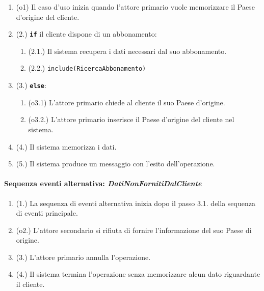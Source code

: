\documentclass{article}
\begin{document}
	\begin{enumerate}[itemsep=8pt,parsep=0pt]
	    \item(o1) Il caso d'uso inizia quando l'attore primario vuole memorizzare il Paese d'origine del cliente. 
	    \item(2.) \texttt{\textbf{if}} il cliente dispone di un abbonamento:
			\begin{enumerate}	[leftmargin=28pt]
			\item (2.1.) Il sistema recupera i dati necessari dal suo abbonamento. %
			\item (2.2.) \texttt{{include(RicercaAbbonamento)}}
  			\end{enumerate}
  		\item(3.) \texttt{\textbf{else}}:
  		\begin{enumerate}	[leftmargin=28pt]
	        \item(o3.1) L'attore primario chiede al cliente il suo Paese d'origine.
	        \item(o3.2.) L'attore primario inserisce il Paese d'origine del cliente nel sistema.
	    \end{enumerate}
		\item(4.) Il sistema memorizza i dati.
		\item(5.) Il sistema produce un messaggio con l'esito dell'operazione.
	
	\end{enumerate}
	
	\paragraph{Sequenza eventi alternativa: \emph{DatiNonFornitiDalCliente}}
		\begin{enumerate}[itemsep=8pt,parsep=0pt]
				\item (1.) La sequenza di eventi alternativa inizia dopo il passo 3.1. della sequenza di eventi principale.
				\item (o2.) L'attore secondario si rifiuta di fornire l'informazione del suo Paese di origine.
				\item (3.) L'attore primario annulla l'operazione.
				\item (4.) Il sistema termina l'operazione senza memorizzare alcun dato riguardante il cliente.
		\end{enumerate}
	



	
\newpage	
\end{document}
